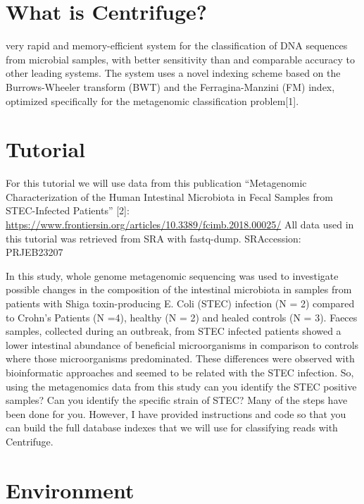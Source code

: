 \documentclass[
]{book}
\begin{document}
\hypertarget{what-is-centrifuge}{%
\section{What is Centrifuge?}\label{what-is-centrifuge}}

very rapid and memory-efficient system for the classification of DNA sequences from microbial
samples, with better sensitivity than and comparable accuracy to other leading systems. The system uses a
novel indexing scheme based on the Burrows-Wheeler transform (BWT) and the Ferragina-Manzini (FM) index,
optimized specifically for the metagenomic classification problem{[}1{]}.

\hypertarget{tutorial}{%
\section{Tutorial}\label{tutorial}}

For this tutorial we will use data from this publication ``Metagenomic Characterization of the Human Intestinal
Microbiota in Fecal Samples from STEC-Infected Patients'' {[}2{]}: \url{https://www.frontiersin.org/articles/10.3389/fcimb.2018.00025/}
All data used in this tutorial was retrieved from SRA with fastq-dump. SRAccession: PRJEB23207

In this study, whole genome metagenomic sequencing was used to investigate possible changes in the composition
of the intestinal microbiota in samples from patients with Shiga toxin-producing E. Coli (STEC) infection (N
= 2) compared to Crohn's Patients (N =4), healthy (N = 2) and healed controls (N = 3). Faeces samples,
collected during an outbreak, from STEC infected patients showed a lower intestinal abundance of beneficial
microorganisms in comparison to controls where those microorganisms predominated. These differences were
observed with bioinformatic approaches and seemed to be related with the STEC infection. So, using the
metagenomics data from this study can you identify the STEC positive samples? Can you identify the specific
strain of STEC?
Many of the steps have been done for you. However, I have provided instructions and code so that you can
build the full database indexes that we will use for classifying reads with Centrifuge.

\hypertarget{environment}{%
\section{Environment}\label{environment}}
\end{document}
